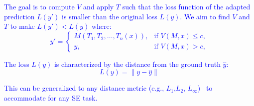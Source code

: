 \textcolor{blue}{The goal is to compute \( V \) and apply \( T \) such that the loss function of the adapted prediction \( L(y') \) is smaller than the original loss \( L(y) \).} \textcolor{blue}{We aim to find \( V \) and \( T \) to make \( L(y') < L(y) \) where:} 
\vspace{-1mm}
\textcolor{blue}{\begin{equation*}
y' = 
\begin{cases} 
M(T_1, T_2, \ldots, T_n(x)), & \text{if } V(M,x) \leq c, \\ 
y, & \text{if } V(M,x) > c,
\end{cases}
\end{equation*}}



\textcolor{blue}{The loss \( L(y) \) is characterized by the distance from the ground truth \(\hat{y} \): 
{\small\begin{equation*}
L(y) = \|y - \hat{y}\|
\end{equation*}} }

\textcolor{blue}{This can be generalized to any distance metric (e.g., \( L_1 \),\( L_2 \), \(L_{\infty}\))~\cite{carlini2017towards, papernot2016distillation, szegedy2013intriguing, papernot2016effectiveness} to accommodate for any SE task. }






